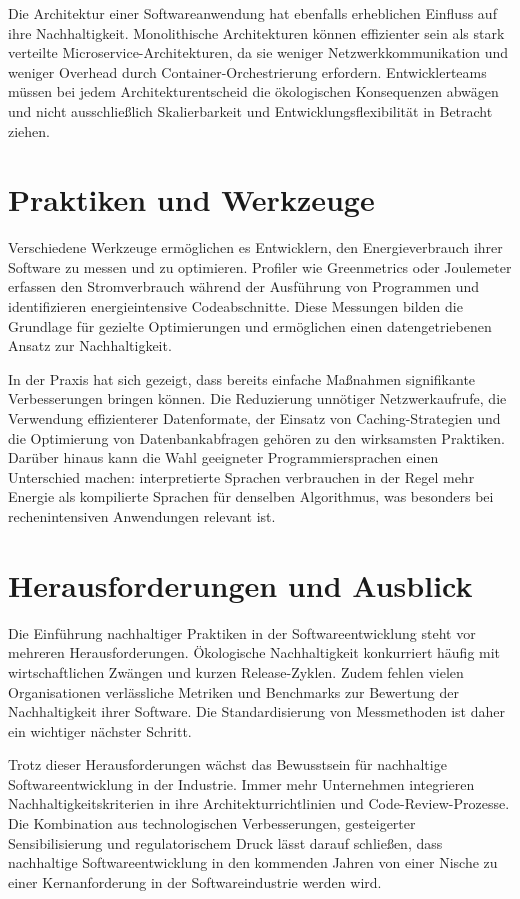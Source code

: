 \documentclass[
    language=ngerman,
    doctype=article,
]{../../omnilatex}
\begin{document}
Die Architektur einer Softwareanwendung hat ebenfalls erheblichen Einfluss auf ihre Nachhaltigkeit. Monolithische Architekturen können effizienter sein als stark verteilte Microservice-Architekturen, da sie weniger Netzwerkkommunikation und weniger Overhead durch Container-Orchestrierung erfordern. Entwicklerteams müssen bei jedem Architekturentscheid die ökologischen Konsequenzen abwägen und nicht ausschließlich Skalierbarkeit und Entwicklungsflexibilität in Betracht ziehen.

\section{Praktiken und Werkzeuge}
Verschiedene Werkzeuge ermöglichen es Entwicklern, den Energieverbrauch ihrer Software zu messen und zu optimieren. Profiler wie Greenmetrics oder Joulemeter erfassen den Stromverbrauch während der Ausführung von Programmen und identifizieren energieintensive Codeabschnitte. Diese Messungen bilden die Grundlage für gezielte Optimierungen und ermöglichen einen datengetriebenen Ansatz zur Nachhaltigkeit.

In der Praxis hat sich gezeigt, dass bereits einfache Maßnahmen signifikante Verbesserungen bringen können. Die Reduzierung unnötiger Netzwerkaufrufe, die Verwendung effizienterer Datenformate, der Einsatz von Caching-Strategien und die Optimierung von Datenbankabfragen gehören zu den wirksamsten Praktiken. Darüber hinaus kann die Wahl geeigneter Programmiersprachen einen Unterschied machen: interpretierte Sprachen verbrauchen in der Regel mehr Energie als kompilierte Sprachen für denselben Algorithmus, was besonders bei rechenintensiven Anwendungen relevant ist.

\section{Herausforderungen und Ausblick}
Die Einführung nachhaltiger Praktiken in der Softwareentwicklung steht vor mehreren Herausforderungen. Ökologische Nachhaltigkeit konkurriert häufig mit wirtschaftlichen Zwängen und kurzen Release-Zyklen. Zudem fehlen vielen Organisationen verlässliche Metriken und Benchmarks zur Bewertung der Nachhaltigkeit ihrer Software. Die Standardisierung von Messmethoden ist daher ein wichtiger n{\"a}chster Schritt.

Trotz dieser Herausforderungen wächst das Bewusstsein für nachhaltige Softwareentwicklung in der Industrie. Immer mehr Unternehmen integrieren Nachhaltigkeitskriterien in ihre Architekturrichtlinien und Code-Review-Prozesse. Die Kombination aus technologischen Verbesserungen, gesteigerter Sensibilisierung und regulatorischem Druck lässt darauf schließen, dass nachhaltige Softwareentwicklung in den kommenden Jahren von einer Nische zu einer Kernanforderung in der Softwareindustrie werden wird.
\end{document}
